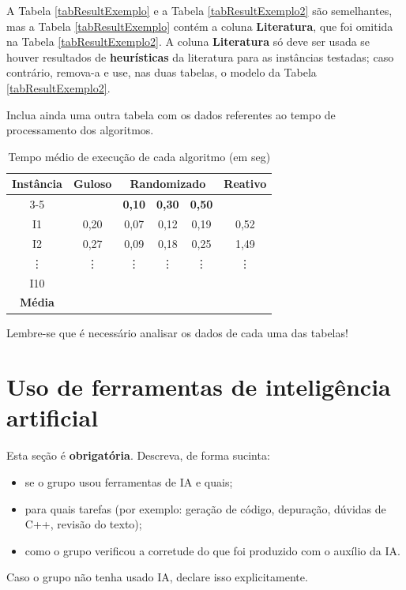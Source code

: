 \documentclass[12pt]{article}
\begin{document}
A Tabela \ref{tabResultExemplo} e a Tabela \ref{tabResultExemplo2} são semelhantes, mas a Tabela \ref{tabResultExemplo} contém a coluna \textbf{Literatura}, que foi omitida na Tabela \ref{tabResultExemplo2}. A coluna \textbf{Literatura} só deve ser usada se houver resultados de \textbf{heurísticas} da literatura para as instâncias testadas; caso contrário, remova-a e use, nas duas tabelas, o modelo da Tabela \ref{tabResultExemplo2}.

Inclua ainda uma outra tabela com os dados  referentes ao tempo de processamento dos algoritmos. 


\begin{table}[htbp]
\centering
\caption{Tempo médio de execução de cada algoritmo (em seg)}
\renewcommand{\arraystretch}{1.2}
{
\footnotesize
\begin{tabular}{|c|c|c|c|c|c|}
\hline
\textbf{Instância} & \textbf{Guloso} & \multicolumn{3}{c|}{\textbf{Randomizado}} & \textbf{Reativo} \\ \cline{3-5}
 & &  \multicolumn{1}{c|}{{\bf 0,10}} & \multicolumn{1}{c|}{{\bf 0,30}} & \multicolumn{1}{c|}{{\bf 0,50}} & \\
\hline
I1 & 0,20 & 0,07 &  0,12 & 0,19 & 0,52 \\
I2 & 0,27 & 0,09 &  0,18 & 0,25 & 1,49 \\
\vdots &  \vdots & \vdots & \vdots & \vdots &  \vdots \\
I10 &  &  &  &  &  \\
\hline
\textbf{Média} &  &  &  &  &  \\
\hline
\end{tabular}
}
\label{tabResultTempo}
\end{table}

Lembre-se que é necessário analisar os dados de cada uma das tabelas!

\section{Uso de ferramentas de inteligência artificial}
\label{secIA}

Esta seção é \textbf{obrigatória}. Descreva, de forma sucinta:
\begin{itemize}
    \item se o grupo usou ferramentas de IA e quais;
    \item para quais tarefas (por exemplo: geração de código, depuração, dúvidas de C++, revisão do texto);
    \item como o grupo verificou a corretude do que foi produzido com o auxílio da IA.
\end{itemize}
Caso o grupo não tenha usado IA, declare isso explicitamente.
\end{document}
